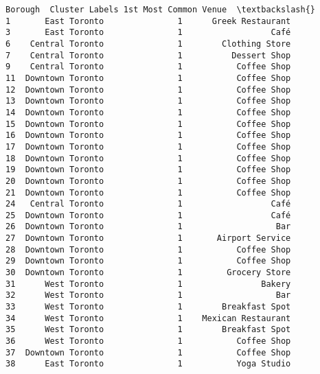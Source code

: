 \documentclass[11pt]{article}
\makeatletter
\newcommand{\boxspacing}{\kern\kvtcb@left@rule\kern\kvtcb@boxsep}
\newcommand{\prompt}[4]{
        \ttfamily\llap{{\color{#2}[#3]:\hspace{3pt}#4}}\vspace{-\baselineskip}
    }
\makeatother
\begin{document}
            \begin{tcolorbox}[breakable, size=fbox, boxrule=.5pt, pad at break*=1mm, opacityfill=0]
\prompt{Out}{outcolor}{46}{\boxspacing}
\begin{Verbatim}[commandchars=\\\{\}]
             Borough  Cluster Labels 1st Most Common Venue  \textbackslash{}
1       East Toronto               1      Greek Restaurant
3       East Toronto               1                  Café
6    Central Toronto               1        Clothing Store
7    Central Toronto               1          Dessert Shop
9    Central Toronto               1           Coffee Shop
11  Downtown Toronto               1           Coffee Shop
12  Downtown Toronto               1           Coffee Shop
13  Downtown Toronto               1           Coffee Shop
14  Downtown Toronto               1           Coffee Shop
15  Downtown Toronto               1           Coffee Shop
16  Downtown Toronto               1           Coffee Shop
17  Downtown Toronto               1           Coffee Shop
18  Downtown Toronto               1           Coffee Shop
19  Downtown Toronto               1           Coffee Shop
20  Downtown Toronto               1           Coffee Shop
21  Downtown Toronto               1           Coffee Shop
24   Central Toronto               1                  Café
25  Downtown Toronto               1                  Café
26  Downtown Toronto               1                   Bar
27  Downtown Toronto               1       Airport Service
28  Downtown Toronto               1           Coffee Shop
29  Downtown Toronto               1           Coffee Shop
30  Downtown Toronto               1         Grocery Store
31      West Toronto               1                Bakery
32      West Toronto               1                   Bar
33      West Toronto               1        Breakfast Spot
34      West Toronto               1    Mexican Restaurant
35      West Toronto               1        Breakfast Spot
36      West Toronto               1           Coffee Shop
37  Downtown Toronto               1           Coffee Shop
38      East Toronto               1           Yoga Studio


\end{Verbatim}
\end{tcolorbox}
\end{document}
